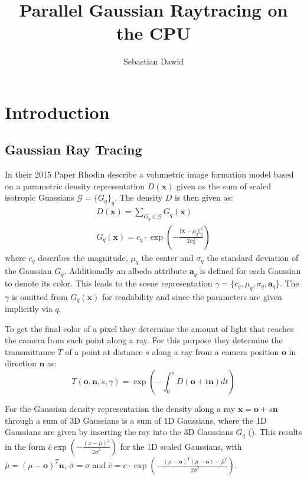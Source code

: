\documentclass[a4paper, 11pt]{memoir}
\title{Parallel Gaussian Raytracing on the CPU}
\author{Sebastian Dawid}
\begin{document}
    \frontmatter
    \smarttitle
    \newpage
    \tableofcontents*

    \clearpage
    \thispagestyle{abs}
    \abstractintoc
    \begin{abstract}
        \lipsum[1]
    \end{abstract}

    \mainmatter
    \chapter{Introduction}

    \section{Gaussian Ray Tracing}
    \label{sec:int_grt}
    In their 2015 Paper  \cite{Rhodin:2015} Rhodin \etal describe a volumetric image formation
    model based on a parametric density representation $D(\mathbf{x})$ given as the sum of scaled isotropic Guassians
    $\mathcal{G} = \{ G_q \}_q$. The density $D$ is then given as:
    \begin{align}
        D(\mathbf{x}) = \sum_{G_q \in \mathcal{G}} G_q(\mathbf{x})
        \label{eq:density}\\
        G_q(\mathbf{x}) = c_q \cdot \exp{\left( - \frac{\Vert\mathbf{x} - \mu_q\Vert_2^2}{2\sigma_q^2} \right)}
        \label{eq:gaussian}
    \end{align}
    where $c_q$ describes the magnitude, $\mu_q$ the center and $\sigma_q$ the standard deviation of the Gaussian $G_q$.
    Additionally an \gls{albedo} attribute $\mathbf{a}_q$ is defined for each Gaussian to denote its color. This leads
    to the scene representation $\gamma = \{ c_q, \mu_q, \sigma_q, \mathbf{a}_q \}$. The $\gamma$ is omitted from
    $G_q(\mathbf{x})$ for readability and since the parameters are given implicitly via $q$.

    To get the final color of a pixel they determine the amount of light that reaches the camera from each point
    along a ray. For this purpose they determine the \gls{transmittance} $T$ of a point at distance $s$ along a ray from
    a camera position $\mathbf{o}$ in direction $\mathbf{n}$ as:
    \begin{equation}
        T(\mathbf{o}, \mathbf{n}, s, \gamma) = \exp{\left( - \int_0^s D(\mathbf{o} + t\mathbf{n}) dt \right)}
        \label{eq:transmittance}
    \end{equation}

    For the Gaussian density representation the density along a ray $\mathbf{x} = \mathbf{o} + s\mathbf{n}$ through a
    sum of 3D Gaussians is a sum of 1D Gaussians, where the 1D Gaussians are given by inserting the ray into the
    3D Gaussians $G_q$ (). This results in the form
    $\bar{c} \exp{\left( - \frac{(x - \bar{\mu})^2}{2\bar{\sigma}^2} \right)}$ for the 1D scaled Gaussians, with
    $\bar{\mu} = (\mu - \mathbf{o})^T\mathbf{n}$, $\bar{\sigma} = \sigma$ and
    $\bar{c} = c \cdot \exp{\left( - \frac{(\mu - \mathbf{o})^T(\mu - \mathbf{o}) - \bar{\mu}^2}{2\bar{\sigma}^2} \right)}$.
\end{document}
